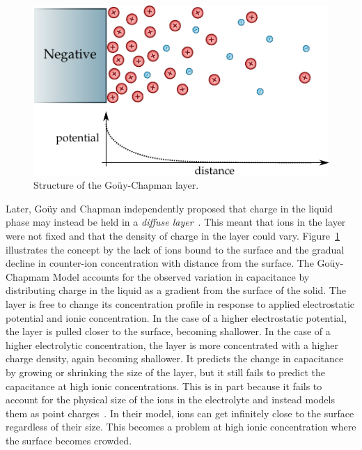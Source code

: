       \begin{figure}
        \begin{center}
          \includegraphics{content/introduction/graphics/model_guoyChapman}
        \end{center}
        \caption{Structure of the Goüy-Chapman layer.}
        \label{fig:doubleLayerModel_gouyChapman}
      \end{figure}
      Later, Goüy and Chapman independently proposed that charge in the liquid phase may instead be held in a \emph{diffuse layer}~\cite{Chapman1913}.
      This meant that ions in the layer were not fixed and that the density of charge in the layer could vary.
      Figure~\ref{fig:doubleLayerModel_gouyChapman} illustrates the concept by the lack of ions bound to the surface and the gradual decline in counter-ion concentration with distance from the surface.
      The Goüy-Chapmam Model accounts for the observed variation in capacitance by distributing charge in the liquid as a gradient from the surface of the solid.
      The layer is free to change its concentration profile in response to applied electrostatic potential and ionic concentration.
      In the case of a higher electrostatic potential, the layer is pulled closer to the surface, becoming shallower.
      In the case of a higher electrolytic concentration, the layer is more concentrated with a higher charge density, again becoming shallower.
      It predicts the change in capacitance by growing or shrinking the size of the layer, but it still fails to predict the capacitance at high ionic concentrations.
      This is in part because it fails to account for the physical size of the ions in the electrolyte and instead models them as point charges~\cite{Bard1980}.
      In their model, ions can get infinitely close to the surface regardless of their size.
      This becomes a problem at high ionic concentration where the surface becomes crowded.

